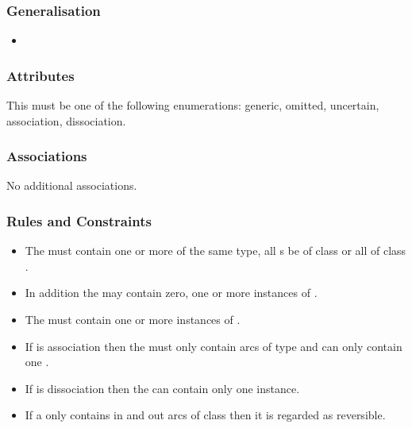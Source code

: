 \subsubsection{Generalisation}

\begin{itemize}
\item {}
\end{itemize}

\subsubsection{Attributes}

\begin{attributes}
   This must be one of the following
  enumerations: generic, omitted, uncertain, association, dissociation.
\end{attributes}

\subsubsection{Associations}

No additional associations.

\subsubsection{Rules and Constraints}

\begin{itemize}
\item The  must contain one or more
   of the same type, \ie all s be of class
   or all of class
  .
\item In addition the  may contain zero, one or more
  instances of .
\item The  must contain one or more
 instances of .
\item If  is association then the
   must only contain arcs of type
   and  can only contain
  one .
\item If  is dissociation then the
   can contain only one 
  instance.
\item If a  only contains in and out
  arcs of class  then it is regarded as
  reversible.
\end{itemize}

